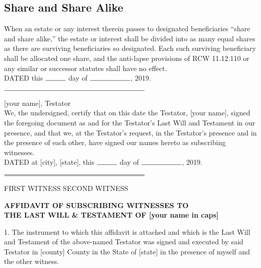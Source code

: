 \documentclass[11.5pt]{article}
\begin{document}
\subsection{Share and Share Alike} When an estate or any interest therein passes to designated beneficiaries ``share and share alike,'' the estate or interest shall be divided into as many equal shares as there are surviving beneficiaries so designated. Each such surviving beneficiary shall be allocated one share, and the anti-lapse provisions of RCW 11.12.110 or any similar or successor statutes shall have no effect.
\vspace{1.5cm}
\\

DATED this $\rule{1cm}{0.15mm}$ day of $\rule{2cm}{0.15mm}$, 2019.
\vspace{1cm}


$\rule{7cm}{0.15mm}$

\hspace*{0mm}\phantom{}[your name], Testator
\vspace{1cm}\\

We, the undersigned, certify that on this date the Testator, [your name], signed the foregoing document as and for the Testator’s Last Will and Testament in our presence, and that we, at the Testator’s request, in the Testator’s presence and in the presence of each other, have signed our names hereto as subscribing witnesses.
\\

DATED at [city], [state], this $\rule{1cm}{0.15mm}$ day of $\rule{2cm}{0.15mm}$, 2019.
\vspace{1cm}

$\rule{7cm}{0.15mm}$\hfill$\rule{7cm}{0.15mm}$

\hspace*{0mm}\phantom{}FIRST WITNESS\hspace*{7.5cm} SECOND WITNESS

\pagebreak
\begin{center}
\textbf{AFFIDAVIT OF SUBSCRIBING WITNESSES TO 
	\\THE LAST WILL \& TESTAMENT OF [your name in caps]}
\end{center}
1. The instrument to which this affidavit is attached and which is the Last Will and Testament of the above-named Testator was signed and executed by said Testator in [county] County in the State of [state] in the presence of myself and the other witness.
\\
\end{document}
